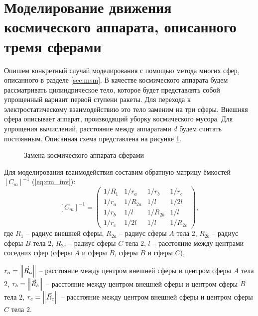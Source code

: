 \section{Моделирование движения космического аппарата, описанного тремя сферами}
\label{sec:3sph}

Опишем конкретный случай моделирования с помощью метода многих сфер, описанного в разделе \ref{sec:msm}.
В качестве космического аппарата будем рассматривать цилиндрическое тело, которое будет представлять собой упрощенный вариант первой ступени ракеты.
Для перехода к электростатическому взаимодействию это тело заменим на три сферы.
Внешняя сфера описывает аппарат, производящий уборку космического мусора.
Для упрощения вычислений, расстояние между аппаратами $d$ будем считать постоянным.
Описанная схема представлена на рисунке \ref{ris:3sph}.

\begin{figure}[H]
	\caption{Замена космического аппарата сферами}
	\label{ris:3sph}
\end{figure}

Для моделирования взаимодействия составим обратную матрицу ёмкостей $[C_m]^{-1}$ (\ref{eq:cm_inv}):
\begin{equation}
\label{eq:3sph_cm}
	[C_m]^{-1} = 
	\begin{pmatrix}
		1/R_1	&	1/r_a	&	1/r_b	&	1/r_c\\
		1/r_a	&	1/R_{2a}	&	1/l		&	1/2l\\
		1/r_b	&	1/l		&	1/R_{2b}	&	1/l\\
		1/r_c	&	1/2l		&	1/l		&	1/R_{2c}
	\end{pmatrix},
\end{equation}
где $R_1$ – радиус внешней сферы, $R_{2a}$ – радиус сферы $A$ тела $2$, $R_{2b}$ – радиус сферы $B$ тела $2$, $R_{2c}$ – радиус сферы $C$ тела $2$, $l$ – расстояние между центрами соседних сфер (сферы $A$ и сферы $B$, сферы $B$ и сферы $C$),

\noindent $r_a = \left\lVert\vec{R}_a\right\rVert$ – расстояние между центром внешней сферы и центром сферы $A$ тела $2$, $r_b = \left\lVert\vec{R}_b\right\rVert$ – расстояние между центром внешней сферы и центром сферы $B$ тела $2$, $r_c = \left\lVert\vec{R}_c\right\rVert$ – расстояние между центром внешней сферы и центром сферы $C$ тела $2$.


